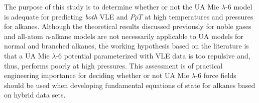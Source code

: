 \documentclass[preprint,letterpaper,floatfix,citeautoscript,aip,jcp]{revtex4-1}
\begin{document}
The purpose of this study is to determine whether or not the UA Mie $\lambda$-6 model is adequate for predicting \textit{both} VLE and 
$P \rho T$ at high temperatures and pressures for alkanes. Although the theoretical results discussed previously for noble gases and all-atom \textit{n}-alkane models are not necessarily applicable to UA models for normal and branched alkanes, the working hypothesis based on the literature is that a UA Mie $\lambda$-6 potential parameterized with VLE data is too repulsive and, thus, performs poorly at high pressures.
This assessment is of practical engineering importance for deciding whether or not UA Mie $\lambda$-6 force fields should be used when developing fundamental equations of state for alkanes based on hybrid data sets.




%
%

\end{document}
